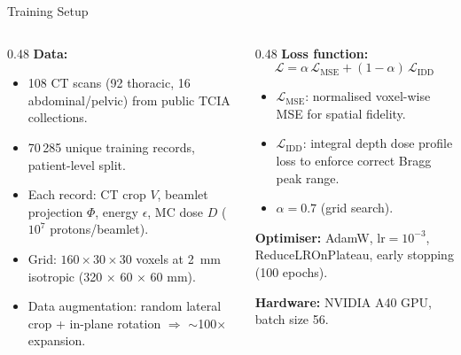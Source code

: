 \documentclass[aspectratio=169, 10pt]{beamer}
\begin{document}
\begin{frame}{Training Setup}
  \begin{columns}[T]
    \begin{column}{0.48\textwidth}
      \textbf{Data:}
      \begin{itemize}\setlength{\itemsep}{3pt}
        \item 108 CT scans (92 thoracic, 16 abdominal/pelvic)
              from public TCIA collections.
        \item 70\,285 unique training records, patient-level split.
        \item Each record: CT crop $V$, beamlet projection $\Phi$,
              energy $\epsilon$, MC dose $D$ ($10^7$ protons/beamlet).
        \item Grid: $160 \times 30 \times 30$ voxels at \SI{2}{mm}
              isotropic (320 $\times$ 60 $\times$ 60 mm).
        \item Data augmentation: random lateral crop + in-plane
              rotation $\Rightarrow$ $\sim$100$\times$ expansion.
      \end{itemize}
    \end{column}
    \begin{column}{0.48\textwidth}
      \textbf{Loss function:}
      \[
        \mathcal{L} = \alpha\, \mathcal{L}_{\text{MSE}}
        + (1-\alpha)\, \mathcal{L}_{\text{IDD}}
      \]
      \begin{itemize}\setlength{\itemsep}{3pt}
        \item $\mathcal{L}_{\text{MSE}}$: normalised voxel-wise MSE
              for spatial fidelity.
        \item $\mathcal{L}_{\text{IDD}}$: integral depth dose profile
              loss to enforce correct Bragg peak range.
        \item $\alpha = 0.7$ (grid search).
      \end{itemize}

      \vspace{4pt}
      \textbf{Optimiser:} AdamW, $\text{lr} = 10^{-3}$,
      ReduceLROnPlateau, early stopping (100 epochs).

      \vspace{4pt}
      \textbf{Hardware:} NVIDIA A40 GPU, batch size 56.
    \end{column}
  \end{columns}
\end{frame}

\end{document}
